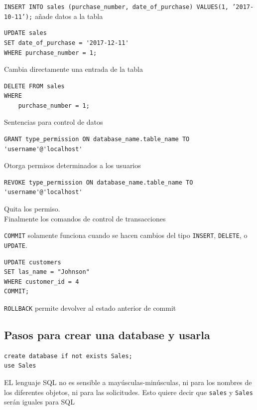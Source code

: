 \texttt{INSERT INTO sales (purchase\_number, date\_of\_purchase) VALUES(1, '2017-10-11');} añade datos a la tabla

\begin{verbatim}
UPDATE sales 
SET date_of_purchase = '2017-12-11'
WHERE purchase_number = 1;
\end{verbatim}

Cambia directamente una entrada de la tabla


\begin{verbatim}
DELETE FROM sales
WHERE
    purchase_number = 1;
\end{verbatim}


Sentencias para control de datos

\begin{verbatim}
GRANT type_permission ON database_name.table_name TO 'username'@'localhost'
\end{verbatim}

Otorga permisos determinados a los usuarios


\begin{verbatim}
REVOKE type_permission ON database_name.table_name TO 'username'@'localhost'
\end{verbatim}

Quita los permiso. \\

Finalmente los comandos de control de transacciones

\texttt{COMMIT} solamente funciona cuando se hacen cambios del tipo \texttt{INSERT}, \texttt{DELETE}, o \texttt{UPDATE}.


\begin{verbatim}
UPDATE customers
SET las_name = "Johnson"
WHERE customer_id = 4
COMMIT;
\end{verbatim}


\texttt{ROLLBACK} permite devolver al estado anterior de commit

\subsection{Pasos para crear una database y usarla}

\begin{verbatim}
create database if not exists Sales; 
use Sales
\end{verbatim}
EL lenguaje SQL no es sensible a mayúsculas-minúsculas, ni para los nombres de los diferentes objetos, ni para las solicitudes. Esto quiere decir que \texttt{sales} y \texttt{Sales} serán iguales para SQL

